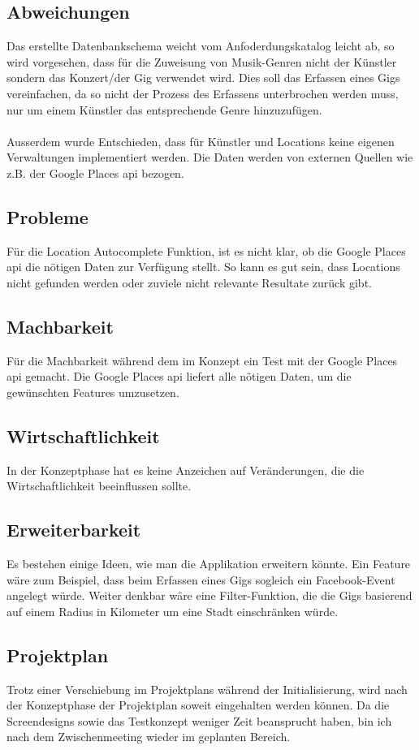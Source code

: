 \subsection{Abweichungen}

Das erstellte Datenbankschema weicht vom Anfoderdungskatalog leicht ab,
so wird vorgesehen, dass für die Zuweisung von Musik-Genren nicht der Künstler
sondern das Konzert/der Gig verwendet wird.
Dies soll das Erfassen eines Gigs vereinfachen, da so nicht der Prozess des
Erfassens unterbrochen werden muss, nur um einem Künstler das entsprechende
Genre hinzuzufügen.\\
\\
Ausserdem wurde Entschieden, dass für Künstler und Locations keine eigenen
Verwaltungen implementiert werden. Die Daten werden von externen Quellen
wie z.B. der Google Places \acrshort{api} bezogen.

\subsection{Probleme}

Für die Location Autocomplete Funktion, ist es nicht klar, ob die
Google Places \acrshort{api} die nötigen Daten zur Verfügung stellt. So kann es gut sein,
dass Locations nicht gefunden werden oder zuviele nicht relevante Resultate
zurück gibt.

\subsection{Machbarkeit}

Für die Machbarkeit während dem im Konzept ein Test mit der Google Places \acrshort{api}
gemacht. Die Google Places \acrshort{api} liefert alle nötigen Daten, um die gewünschten
Features umzusetzen.

\subsection{Wirtschaftlichkeit}

In der Konzeptphase hat es keine Anzeichen auf Veränderungen, die die
Wirtschaftlichkeit beeinflussen sollte.

\subsection{Erweiterbarkeit}

Es bestehen einige Ideen, wie man die Applikation erweitern könnte. Ein Feature
wäre zum Beispiel, dass beim Erfassen eines Gigs sogleich ein Facebook-Event
angelegt würde. Weiter denkbar wäre eine Filter-Funktion, die die Gigs basierend
auf einem Radius in Kilometer um eine Stadt einschränken würde.

\subsection{Projektplan}

Trotz einer Verschiebung im Projektplans während der Initialisierung, wird nach
der Konzeptphase der Projektplan soweit eingehalten werden können. Da die
Screendesigns sowie das Testkonzept weniger Zeit beansprucht haben, bin ich
nach dem Zwischenmeeting wieder im geplanten Bereich.
